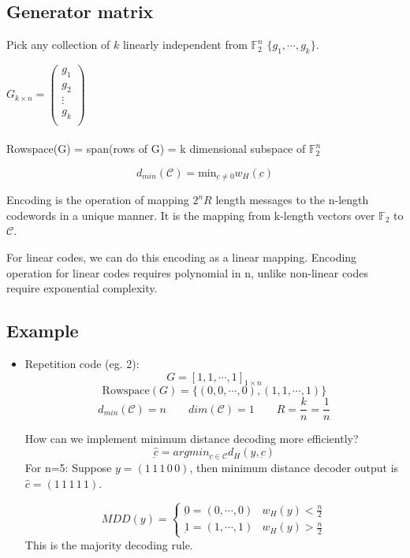 \documentclass{article}
\begin{document}
\subsection{Generator matrix}

Pick any collection of $k$ linearly independent from $\mathbb{F}_2^n$ $\{ g_1,\cdots, g_k\}$.


$ G_{k \times n}=
\begin{pmatrix}
g_1 \\
g_2 \\
\vdots \\
g_k \\
\end{pmatrix}$
\\
\\
Rowspace(G) = span(rows of G) = k dimensional subspace of $\mathbb{F}_2^n$

$$ d_{min}(\mathscr{C})= \text{min}_{\underbar{c} \neq 0}w_H (\underbar{c})$$

Encoding is the operation of mapping $2^nR$ length messages to the n-length codewords in a unique manner. It is the mapping from k-length vectors over $\mathbb{F}_2$ to $\mathscr{C}$.

For linear codes, we can do this encoding as a linear mapping.
Encoding operation for linear codes requires polynomial in n, unlike non-linear codes require exponential complexity.

\subsection{Example}

\begin{itemize}
    \item Repetition code (eg. 2):
    $$ G=   [1,1,\cdots,1]_{1 \times n}$$
    $$ \text{Rowspace}(G)= \{ (0,0,\cdots,0),(1,1,\cdots,1)\}$$
    $$ d_{min}(\mathscr{C})= n \qquad dim(\mathscr{C})=1 \qquad R= \frac{k}{n}= \frac{1}{n}$$

    How can we implement minimum distance decoding more efficiently?
    $$ \hat{\underbar{c}}= argmin_{\underbar{c} \in \mathscr{C}} d_H(y,\underbar{c})$$
    For n=5:
    Suppose $y=(1\,1\,1\,0\,0)$, then minimum distance decoder output is $\hat{c}=(1\,1\,1\,1\,1)$.

    $$ MDD(y)= \begin{cases}
      \underbar{0}=(0,\cdots,0) & w_H(y)<\frac{n}{2} \\
      \underbar{1}=(1,\cdots,1) & w_H(y) > \frac{n}{2}
   \end{cases}$$
   This is the majority decoding rule.
\end{itemize}
\end{document}
